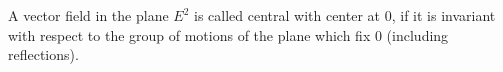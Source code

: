 A vector field in the plane $E^2$ is called central with center at $0$, if it is invariant with respect to the group of motions of the plane which fix $0$ (including reflections).
